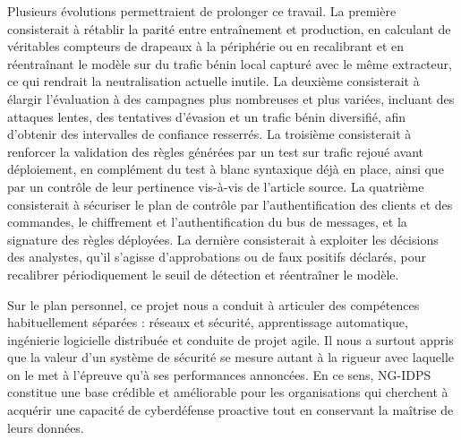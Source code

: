 Plusieurs évolutions permettraient de prolonger ce travail. La première consisterait à rétablir la parité entre entraînement et production, en calculant de véritables compteurs de drapeaux à la périphérie ou en recalibrant et en réentraînant le modèle sur du trafic bénin local capturé avec le même extracteur, ce qui rendrait la neutralisation actuelle inutile. La deuxième consisterait à élargir l'évaluation à des campagnes plus nombreuses et plus variées, incluant des attaques lentes, des tentatives d'évasion et un trafic bénin diversifié, afin d'obtenir des intervalles de confiance resserrés. La troisième consisterait à renforcer la validation des règles générées par un test sur trafic rejoué avant déploiement, en complément du test à blanc syntaxique déjà en place, ainsi que par un contrôle de leur pertinence vis-à-vis de l'article source. La quatrième consisterait à sécuriser le plan de contrôle par l'authentification des clients et des commandes, le chiffrement et l'authentification du bus de messages, et la signature des règles déployées. La dernière consisterait à exploiter les décisions des analystes, qu'il s'agisse d'approbations ou de faux positifs déclarés, pour recalibrer périodiquement le seuil de détection et réentraîner le modèle.

Sur le plan personnel, ce projet nous a conduit à articuler des compétences habituellement séparées : réseaux et sécurité, apprentissage automatique, ingénierie logicielle distribuée et conduite de projet agile. Il nous a surtout appris que la valeur d'un système de sécurité se mesure autant à la rigueur avec laquelle on le met à l'épreuve qu'à ses performances annoncées. En ce sens, NG-IDPS constitue une base crédible et améliorable pour les organisations qui cherchent à acquérir une capacité de cyberdéfense proactive tout en conservant la maîtrise de leurs données.